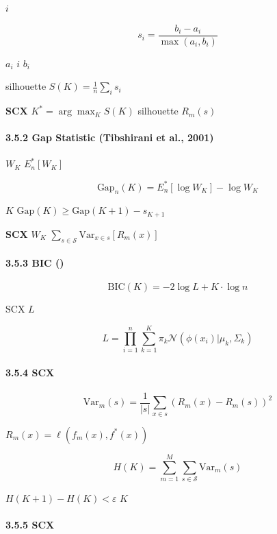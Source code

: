 \documentclass[
  12pt,
]{article}
\begin{document}
 \(i\)

\[s_i = \frac{b_i - a_i}{\max(a_i, b_i)}\]

 \(a_i\)  \(i\) \(b_i\)


 silhouette \(S(K) = \frac{1}{n} \sum_i s_i\)

\textbf{SCX }\(K^* = \arg\max_K S(K)\) silhouette
 \(R_m(s)\) 

\paragraph{3.5.2 Gap Statistic (Tibshirani et al.,
2001)}\label{gap-statistic-tibshirani-et-al.-2001}

 \(W_K\)  \(E_n^*[W_K]\)

\[\text{Gap}_n(K) = E_n^*[\log W_K] - \log W_K\]

 \(K\)  \(\text{Gap}(K) \geq \text{Gap}(K+1) - s_{K+1}\)


\textbf{SCX } \(W_K\) 
\(\sum_{s \in \mathcal{S}} \text{Var}_{x \in s}[R_m(x)]\)

\paragraph{3.5.3 BIC
()}\label{bic-ux8d1dux53f6ux65afux4fe1ux606fux51c6ux5219}

\[\text{BIC}(K) = -2 \log L + K \cdot \log n\]

SCX \(L\) 

\[L = \prod_{i=1}^n \sum_{k=1}^K \pi_k \mathcal{N}(\phi(x_i) | \mu_k, \Sigma_k)\]

\paragraph{3.5.4  SCX
}\label{ux7279ux5b9aux4e8e-scx-ux7684ux7c92ux5ea6ux9009ux62e9ux72b6ux6001ux98ceux9669ux540cux8d28ux6027}



\[\text{Var}_m(s) = \frac{1}{|s|} \sum_{x \in s} (R_m(x) - R_m(s))^2\]

 \(R_m(x) = \ell(f_m(x), f^*(x))\) 



\[H(K) = \sum_{m=1}^M \sum_{s \in \mathcal{S}} \text{Var}_m(s)\]

 \(H(K+1) - H(K) < \varepsilon\)  \(K\)

\paragraph{3.5.5  SCX
}\label{ux63a8ux8350ux7684-scx-ux7c92ux5ea6ux9009ux62e9ux7ba1ux7ebf}
\end{document}
